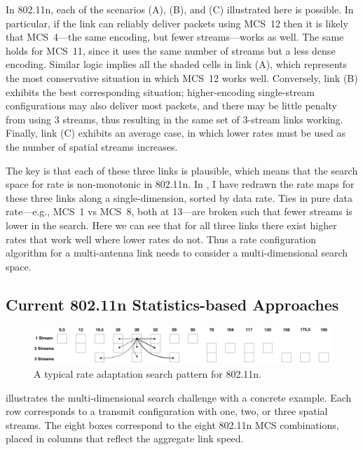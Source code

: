 In 802.11n, each of the scenarios (A), (B), and (C) illustrated here is possible. In particular, if the link can reliably deliver packets using MCS~12 then it is likely that MCS~4---the same encoding, but fewer streams---works as well. The same holds for MCS~11, since it uses the same number of streams but a less dense encoding. Similar logic implies all the shaded cells in link (A), which represents the most conservative situation in which MCS~12 works well. Conversely, link (B) exhibits the best corresponding situation; higher-encoding single-stream configurations may also deliver most packets, and there may be little penalty from using 3 streams, thus resulting in the same set of 3-stream links working. Finally, link (C) exhibits an average case, in which lower rates must be used as the number of spatial streams increases.

The key is that each of these three links is plausible, which means that the search space for rate is non-monotonic in 802.11n. In , I have redrawn the rate maps for these three links along a single-dimension, sorted by data rate. Ties in pure data rate---e.g., MCS~1 vs MCS~8, both at 13\Mbps---are broken such that fewer streams is lower in the search. Here we can see that for all three links there exist higher rates that work well where lower rates do not. Thus a rate configuration algorithm for a multi-antenna link needs to consider a multi-dimensional search space.

\subsection{Current 802.11n Statistics-based Approaches}
\begin{figure}[t]
      \centering
      \includegraphics[scale=0.33]{figures/approach_figs/search_11n.pdf}
      \caption[Rate adaptation search pattern for 802.11n]{\label{fig:search_11n}A typical rate adaptation search pattern for 802.11n.}
\end{figure}
 illustrates the multi-dimensional search challenge with a concrete example. Each row corresponds to a transmit configuration with one, two, or three spatial streams. The eight boxes correspond to the eight 802.11n MCS combinations, placed in columns that reflect the aggregate link speed.

